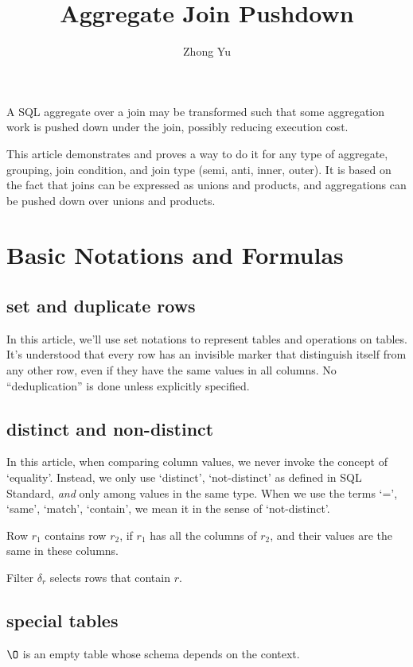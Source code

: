 \documentclass[article]{article}
\begin{document}
\title{ Aggregate Join Pushdown}
\author{Zhong Yu}
\maketitle

A SQL aggregate over a join may be transformed such that some aggregation work is 
pushed down under the join, possibly reducing execution cost.

This article demonstrates and proves a way to do it for any type of aggregate, grouping,
join condition, and join type (semi, anti, inner, outer).
It is based on the fact that joins can be expressed as unions and products,
and aggregations can be pushed down over unions and products.

\section{ Basic Notations and Formulas  }


\subsection { set and duplicate rows }
In this article, we'll use set notations to represent tables and operations on tables.
It's understood that every row has an invisible marker that distinguish itself
from any other row, even if they have the same values in all columns.
No ``deduplication'' is done unless explicitly specified.

\subsection{ distinct and non-distinct }

In this article, when comparing column values, 
we never invoke the concept of `equality'.
Instead, we only use `distinct', `not-distinct' as defined in SQL Standard,
{\it and} only among values in the same type.
When we use the terms `=', `same', `match', `contain', we mean it in the sense of `not-distinct'.

Row $r_1$ contains row $r_2$, if $r_1$ has all the columns of $r_2$,
and their values are the same in these columns.

Filter $\delta_r$ selects rows that contain $r$.
\subsection{ special tables }

$\O$ is an empty table whose schema depends on the context.
\end{document}
